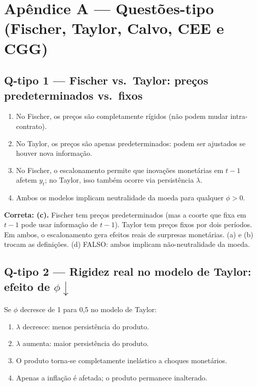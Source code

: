 \documentclass[12pt, a4paper]{article}
\begin{document}
\appendix

\newpage
\section*{\large\color{cyanrbc} Apêndice A --- Questões-tipo (Fischer, Taylor, Calvo, CEE e CGG)}

\subsection*{Q-tipo 1 --- Fischer vs.\ Taylor: preços predeterminados vs.\ fixos}

\begin{enumerate}[label=(\alph*)]
  \item No Fischer, os preços são completamente rígidos (não podem mudar intra-contrato).
  \item No Taylor, os preços são apenas predeterminados: podem ser ajustados se houver nova informação.
  \item No Fischer, o escalonamento permite que inovações monetárias em $t-1$ afetem $y_t$; no Taylor, isso também ocorre via persistência $\lambda$.
  \item Ambos os modelos implicam neutralidade da moeda para qualquer $\phi > 0$.
\end{enumerate}

\begin{resultbox}[title={Gabarito: (c)}]
\textbf{Correta: (c).} Fischer tem preços predeterminados (mas a coorte que fixa em $t-1$ pode usar informação de $t-1$). Taylor tem preços fixos por dois períodos. Em ambos, o escalonamento gera efeitos reais de surpresas monetárias. (a) e (b) trocam as definições. (d) FALSO: ambos implicam não-neutralidade da moeda.
\end{resultbox}

\subsection*{Q-tipo 2 --- Rigidez real no modelo de Taylor: efeito de $\phi\downarrow$}

Se $\phi$ decresce de 1 para 0,5 no modelo de Taylor:

\begin{enumerate}[label=(\alph*)]
  \item $\lambda$ decresce: menos persistência do produto.
  \item $\lambda$ aumenta: maior persistência do produto.
  \item O produto torna-se completamente inelástico a choques monetários.
  \item Apenas a inflação é afetada; o produto permanece inalterado.
\end{enumerate}
\end{document}
